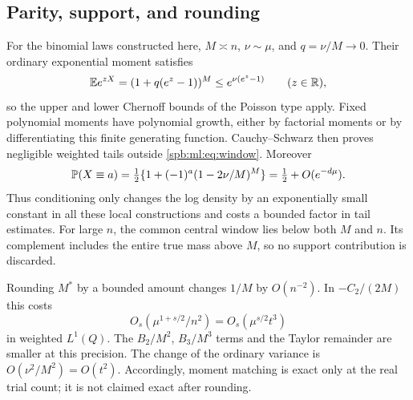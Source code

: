 \subsection{Parity, support, and rounding}
For the binomial laws constructed here, $M\asymp n$, $\nu\sim\mu$, and $q=\nu/M\to0$. Their ordinary exponential moment satisfies
\[
 \mathbb E e^{zX}=(1+q(e^z-1))^M\le e^{\nu(e^z-1)}\qquad(z\in\mathbb R),
\]
so the upper and lower Chernoff bounds of the Poisson type apply. Fixed polynomial moments have polynomial growth, either by factorial moments or by differentiating this finite generating function. Cauchy--Schwarz then proves negligible weighted tails outside \eqref{spb:ml:eq:window}. Moreover
\begin{equation}\label{spb:ml:eq:binparity}
 \mathbb P(X\equiv a)=\tfrac12\{1+(-1)^a(1-2\nu/M)^M\}
                 =\tfrac12+O(e^{-d\mu}).
\end{equation}
Thus conditioning only changes the log density by an exponentially small constant in all these local constructions and costs a bounded factor in tail estimates. For large $n$, the common central window lies below both $M$ and $n$. Its complement includes the entire true mass above $M$, so no support contribution is discarded.

Rounding $M^*$ by a bounded amount changes $1/M$ by $O(n^{-2})$. In $-C_2/(2M)$ this costs
\begin{equation}\label{spb:ml:eq:rounding}
 O_s(\mu^{1+s/2}/n^2)=O_s(\mu^{s/2}t^3)
\end{equation}
in weighted $L^1(Q)$. The $B_2/M^2$, $B_3/M^3$ terms and the Taylor remainder are smaller at this precision. The change of the ordinary variance is $O(\nu^2/M^2)=O(t^2)$. Accordingly, moment matching is exact only at the real trial count; it is not claimed exact after rounding.

